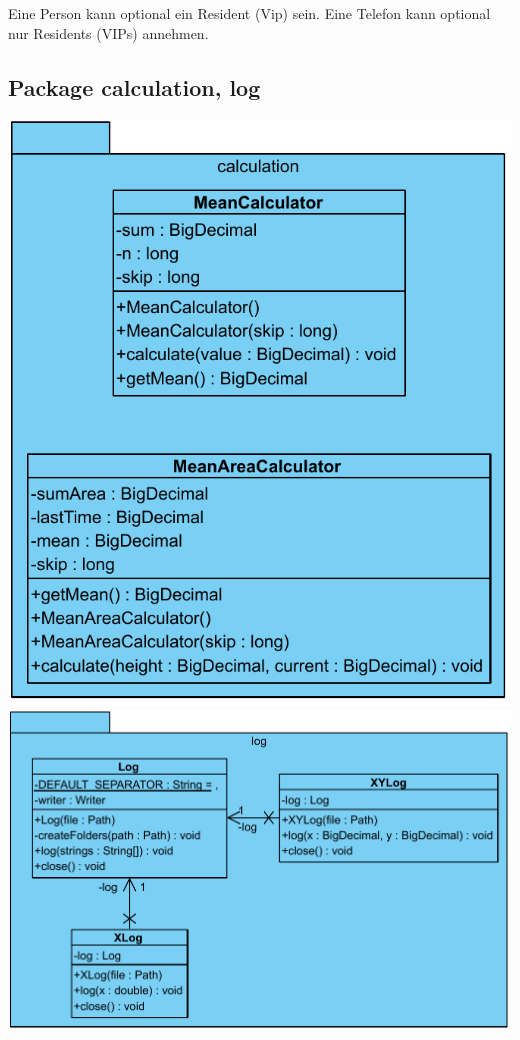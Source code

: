 Eine Person kann optional ein Resident (Vip) sein. Eine Telefon kann optional nur Residents (VIPs) annehmen.

\subsection{Package calculation, log}

\includegraphics[scale=0.3]{abbildungen/uml/calculation.pdf}
\includegraphics[scale=0.3]{abbildungen/uml/log.pdf}


